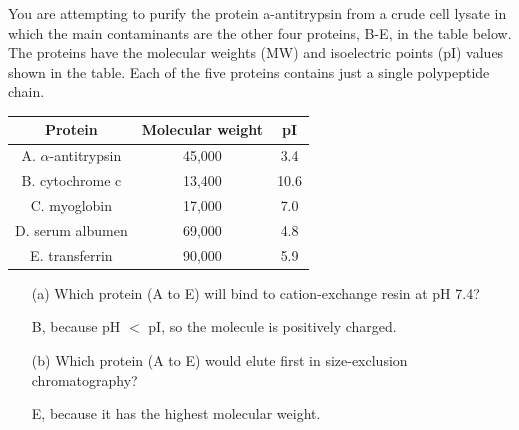 \documentclass[letterpaper, 12pt]{article}
\begin{document}
You are attempting to purify the protein a-antitrypsin from a crude cell lysate in which
the main contaminants are the other four proteins, B-E, in the table below. The proteins
have the molecular weights (MW) and isoelectric points (pI) values shown in the table.
Each of the five proteins contains just a single polypeptide chain.

\begin{table}[H]
\begin{tabular}{|c|c|c|}
\hline
\textbf{Protein} & \textbf{Molecular weight} & \textbf{pI} \\\hline
A. $\alpha$-antitrypsin & 45,000 & 3.4 \\\hline
B. cytochrome c & 13,400 & 10.6 \\\hline
C. myoglobin & 17,000 & 7.0 \\\hline
D. serum albumen & 69,000 & 4.8 \\\hline
E. transferrin & 90,000 & 5.9 \\\hline
\end{tabular}
\end{table}

\begin{itemize}
\item [(a)] Which protein (A to E) will bind to cation-exchange resin at pH 7.4?

B, because pH $<$ pI, so the molecule is positively charged.

\item [(b)] Which protein (A to E) would elute first in size-exclusion chromatography?

E, because it has the highest molecular weight.
\end{itemize}
\end{document}
